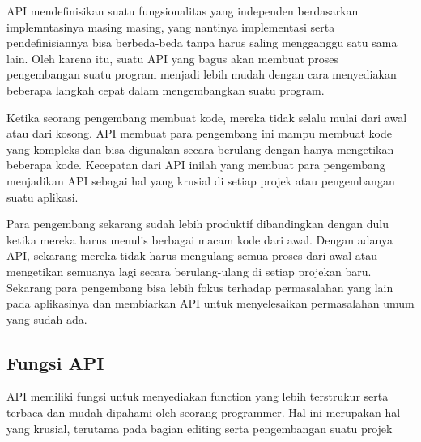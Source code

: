 API mendefinisikan suatu fungsionalitas yang independen berdasarkan implemntasinya masing masing, yang nantinya implementasi serta pendefinisiannya bisa berbeda-beda tanpa harus saling mengganggu satu sama lain. Oleh karena itu, suatu API yang bagus akan membuat proses pengembangan suatu program menjadi lebih mudah dengan cara menyediakan beberapa langkah cepat dalam mengembangkan suatu program.

Ketika seorang pengembang membuat kode, mereka tidak selalu mulai dari awal atau dari kosong. API membuat para pengembang ini mampu membuat kode yang kompleks dan bisa digunakan secara berulang dengan hanya mengetikan beberapa kode. Kecepatan dari API inilah yang membuat para pengembang menjadikan API sebagai hal yang krusial di setiap projek atau pengembangan suatu aplikasi.

Para pengembang sekarang sudah lebih produktif dibandingkan dengan dulu ketika mereka harus menulis berbagai macam kode dari awal. Dengan adanya API, sekarang mereka tidak harus mengulang semua proses dari awal atau mengetikan semuanya lagi secara berulang-ulang di setiap projekan baru. Sekarang para pengembang bisa lebih fokus terhadap permasalahan yang lain pada aplikasinya dan membiarkan API untuk menyelesaikan permasalahan umum yang sudah ada.
\subsection{Fungsi API}
API memiliki fungsi untuk menyediakan function yang lebih terstrukur serta terbaca dan mudah dipahami oleh seorang programmer. Hal ini merupakan hal yang krusial, terutama pada bagian editing serta pengembangan suatu projek

